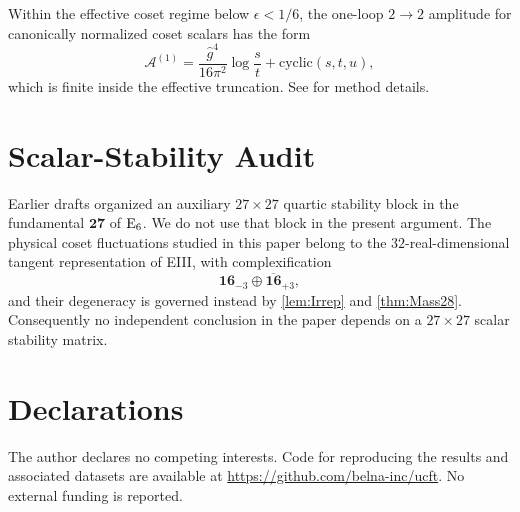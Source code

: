 \documentclass[pdflatex,sn-mathphys-num]{sn-jnl}
\theoremstyle{thmstyleone}
\theoremstyle{thmstylethree}%
\theoremstyle{thmstyletwo}%
\begin{document}
\begin{appendices}
Within the effective coset regime below \(\epsilon<1/6\), the one-loop
\(2\to2\) amplitude for canonically normalized coset scalars has the form
\[
  \mathcal A^{(1)}
  =\frac{\hat g^{4}}{16\pi^{2}}
    \log\frac{s}{t}
  +\text{cyclic}(s,t,u),
\]
which is finite inside the effective truncation. See \cite{Percacci2017} for
method details.

\section{Scalar-Stability Audit}
\label{app:Scalar27}
Earlier drafts organized an auxiliary \(27\times27\) quartic stability block in
the fundamental \(\mathbf{27}\) of \(\mathrm{E}_{6}\). We do not use that block in the
present argument. The physical coset fluctuations studied in this paper belong
to the \(32\)-real-dimensional tangent representation of EIII, with
complexification
\[
  \mathbf{16}_{-3}\oplus\overline{\mathbf{16}}_{+3},
\]
and their degeneracy is governed instead by \autoref{lem:Irrep} and
\autoref{thm:Mass28}. Consequently no independent conclusion in the paper
depends on a \(27\times27\) scalar stability matrix.

\end{appendices}

\section*{Declarations}

The author declares no competing interests.
Code for reproducing the results and associated datasets are available at
\url{https://github.com/belna-inc/ucft}. No external funding is reported.


\end{document}
